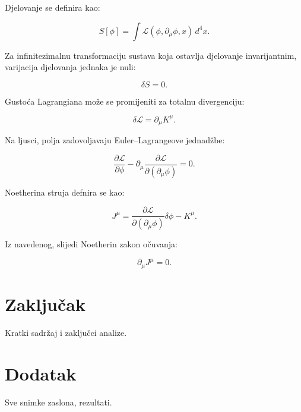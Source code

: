 \documentclass[a4paper,12pt]{article}
\begin{document}
\noindent
Djelovanje se definira kao:

\begin{equation}
S[\phi] = \int \mathcal{L}(\phi,\partial_\mu\phi,x)\,d^4x.
\end{equation}

\noindent
Za infinitezimalnu transformaciju sustava koja ostavlja djelovanje invarijantnim, varijacija djelovanja jednaka je nuli:

\begin{equation}
\delta S = 0.
\end{equation}

\noindent
Gustoća Lagrangiana može se promijeniti za totalnu divergenciju:

\begin{equation}
\delta\mathcal{L} = \partial_\mu K^\mu.
\end{equation}

\noindent
Na ljusci, polja zadovoljavaju Euler–Lagrangeove jednadžbe:

\begin{equation}
\frac{\partial\mathcal{L}}{\partial\phi}
- \partial_\mu
\frac{\partial\mathcal{L}}{\partial(\partial_\mu\phi)}
= 0.
\end{equation}

\noindent
Noetherina struja defnira se kao:

\begin{equation}
J^\mu =
\frac{\partial\mathcal{L}}{\partial(\partial_\mu\phi)}
\delta\phi-K^\mu.
\end{equation}

\noindent
Iz navedenog, slijedi Noetherin zakon očuvanja:

\begin{equation}
\boxed{\partial_\mu J^\mu = 0.}
\end{equation}

\section{Zaključak}
Kratki sadržaj i zaključci analize.

\section{Dodatak}
Sve snimke zaslona, rezultati.

\newpage
{}


\end{document}
